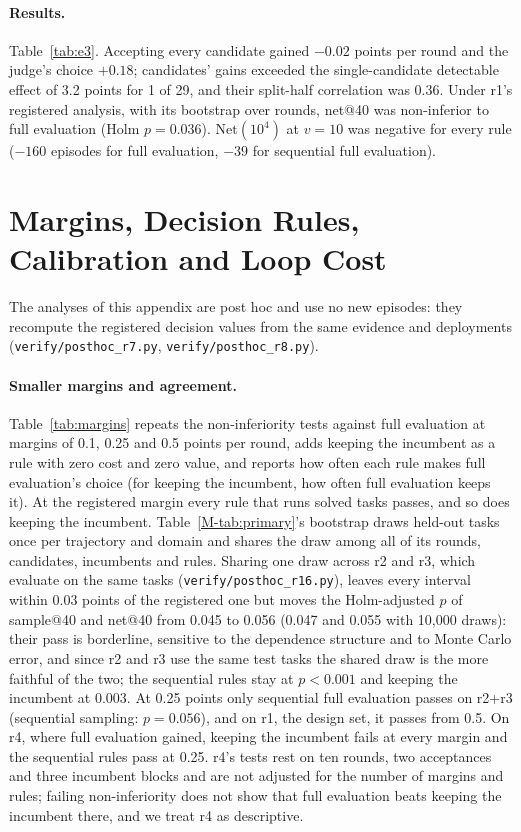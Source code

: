 \documentclass[11pt]{article}
\begin{document}
\paragraph{Results.} Table~\ref{tab:e3}. Accepting every candidate gained $-0.02$ points per round and the judge's choice $+0.18$; candidates' gains exceeded the single-candidate detectable effect of 3.2 points for 1 of 29, and their split-half correlation was 0.36. Under r1's registered analysis, with its bootstrap over rounds, net@40 was non-inferior to full evaluation (Holm $p=0.036$). $\mathrm{Net}(10^4)$ at $v=10$ was negative for every rule ($-160$ episodes for full evaluation, $-39$ for sequential full evaluation).

\section{Margins, Decision Rules, Calibration and Loop Cost}
\label{app:review}

The analyses of this appendix are post hoc and use no new episodes: they recompute the registered decision values from the same evidence and deployments (\texttt{verify/posthoc\_r7.py}, \texttt{verify/posthoc\_r8.py}).

\paragraph{Smaller margins and agreement.} Table~\ref{tab:margins} repeats the non-inferiority tests against full evaluation at margins of 0.1, 0.25 and 0.5 points per round, adds keeping the incumbent as a rule with zero cost and zero value, and reports how often each rule makes full evaluation's choice (for keeping the incumbent, how often full evaluation keeps it). At the registered margin every rule that runs solved tasks passes, and so does keeping the incumbent. Table~\ref*{M-tab:primary}'s bootstrap draws held-out tasks once per trajectory and domain and shares the draw among all of its rounds, candidates, incumbents and rules. Sharing one draw across r2 and r3, which evaluate on the same tasks (\texttt{verify/posthoc\_r16.py}), leaves every interval within 0.03 points of the registered one but moves the Holm-adjusted $p$ of sample@40 and net@40 from 0.045 to 0.056 (0.047 and 0.055 with 10{,}000 draws): their pass is borderline, sensitive to the dependence structure and to Monte Carlo error, and since r2 and r3 use the same test tasks the shared draw is the more faithful of the two; the sequential rules stay at $p<0.001$ and keeping the incumbent at 0.003. At 0.25 points only sequential full evaluation passes on r2+r3 (sequential sampling: $p=0.056$), and on r1, the design set, it passes from 0.5. On r4, where full evaluation gained, keeping the incumbent fails at every margin and the sequential rules pass at 0.25. r4's tests rest on ten rounds, two acceptances and three incumbent blocks and are not adjusted for the number of margins and rules; failing non-inferiority does not show that full evaluation beats keeping the incumbent there, and we treat r4 as descriptive.
\end{document}
